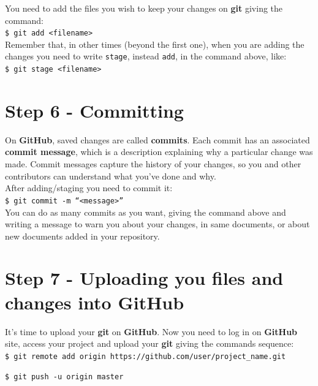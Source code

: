 \documentclass[12pt,a4paper,titlepage,brazil]{article}
\begin{document}
{You need to add the files you wish to keep your changes on {\bf git} giving the command:\\

\texttt{\$ git add <filename>}\\

Remember that, in other times (beyond the first one), when you are adding the changes you need to write \texttt{stage}, instead \texttt{add}, in the command above, like:\\

\texttt{\$ git stage <filename>}


\section{Step 6 - Committing}

On {\bf GitHub}, saved changes are called {\bf commits}. Each commit has an associated {\bf commit message}, which is a description explaining why a particular change was made. Commit messages capture the history of your changes, so you and other contributors can understand what you’ve done and why.\\

After adding/staging you need to commit it:\\

\texttt{\$ git commit -m ``<message>''}\\

You can do as many commits as you want, giving the command above and writing a message to warn you about your changes, in same documents, or about new documents added in your repository.


\section{Step 7 - Uploading you files and changes into GitHub}

It's time to upload your {\bf git} on {\bf GitHub}. Now you need to log in on {\bf GitHub} site, access your project and upload your {\bf git} giving the commands sequence:\\

\texttt{\$ git remote add origin https://github.com/user/project\_name.git}

\texttt{\$ git push -u origin master}\\

}
\end{document}
